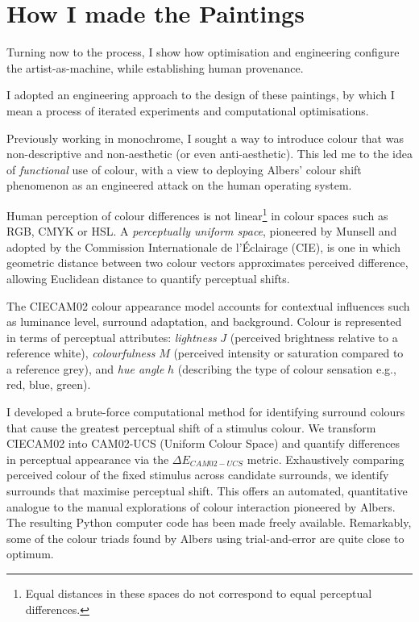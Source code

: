 \documentclass[12pt]{article}
\begin{document}
\section{How I made the Paintings}\label{sec:process}
Turning now to the process, I show how optimisation and engineering
configure the artist-as-machine, while establishing human provenance.

I adopted an engineering approach to the design of these paintings, by
which I mean a process of iterated experiments and computational
optimisations.

Previously working in monochrome, I sought a way to introduce
colour that was non-descriptive and non-aesthetic (or even
anti-aesthetic). This led me to the idea of \emph{functional} use of
colour, with a view to deploying Albers' colour shift phenomenon
as an engineered attack on the human operating system.

Human perception of colour differences\cite{MacAdam1942} is not
linear\footnote{Equal distances in these spaces do not correspond to
  equal perceptual differences.} in colour spaces such as RGB, CMYK or
HSL.\cite{Luo2001CIECAM02} A \emph{perceptually uniform space},
pioneered by Munsell\cite{Munsell1915} and adopted by the Commission
Internationale de l'\'{E}clairage
(CIE),\cite{CIE1976,CIE1978Uniform,Luo2001CIEDE2000} is one in which
geometric distance between two colour vectors approximates perceived
difference, allowing Euclidean distance to quantify perceptual shifts.

The CIECAM02 colour appearance
model\cite{Luo2001CIECAM02,CIE1592004} accounts for
contextual influences such as luminance level, surround adaptation,
and background. Colour is represented in terms of perceptual
attributes: \emph{lightness} $J$ (perceived brightness relative to a
reference white), \emph{colourfulness} $M$ (perceived intensity or
saturation compared to a reference grey), and \emph{hue angle} $h$
(describing the type of colour sensation e.g., red, blue, green).

I developed a brute-force computational method for identifying
surround colours that cause the greatest perceptual shift of a
stimulus colour. We transform CIECAM02 into CAM02-UCS (Uniform Colour
Space) and quantify differences in perceptual appearance via the
$\Delta E_{CAM02-UCS}$ metric. Exhaustively comparing perceived colour
of the fixed stimulus across candidate surrounds, we identify
surrounds that maximise perceptual shift. This offers an automated,
quantitative analogue to the manual explorations of colour interaction
pioneered by Albers.\cite{albers} The resulting Python computer code
has been made freely
available.\cite{grant2025colourshift} Remarkably, some of the colour
triads found by Albers using trial-and-error are quite close to
optimum.
\end{document}
